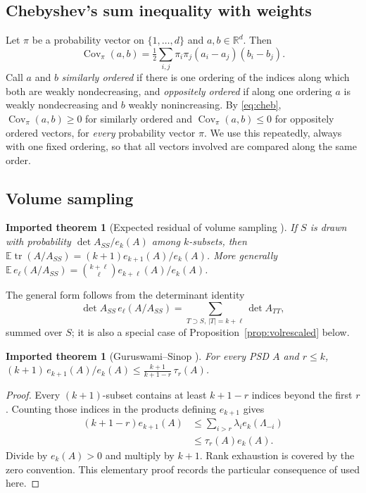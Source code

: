 \documentclass[11pt,a4paper]{article}
\newtheorem{imported}[theorem]{Imported theorem}
\theoremstyle{definition}
\newcommand{\E}{\mathbb{E}}
\newcommand{\R}{\mathbb{R}}
\newcommand{\tr}{\operatorname{tr}}
\newcommand{\Cov}{\operatorname{Cov}}
\begin{document}
\subsection{Chebyshev's sum inequality with weights}
Let $\pi$ be a probability vector on $\{1,\dots,d\}$ and $a,b\in\R^d$. Then
\begin{equation}\label{eq:cheb}
\Cov_\pi(a,b)=\tfrac12\sum_{i,j}\pi_i\pi_j(a_i-a_j)(b_i-b_j).
\end{equation}
Call $a$ and $b$ \emph{similarly ordered} if there is one ordering of the indices along which both are weakly nondecreasing, and \emph{oppositely ordered} if along one ordering $a$ is weakly nondecreasing and $b$ weakly nonincreasing. By \eqref{eq:cheb}, $\Cov_\pi(a,b)\ge0$ for similarly ordered and $\Cov_\pi(a,b)\le0$ for oppositely ordered vectors, for \emph{every} probability vector $\pi$. We use this repeatedly, always with one fixed ordering, so that all vectors involved are compared along the same order.

\subsection{Volume sampling}
\begin{imported}[Expected residual of volume sampling {\cite{DRVW}}]\label{imp:DRVW}
If $S$ is drawn with probability $\det A_{SS}/e_k(A)$ among $k$-subsets, then $\E\tr(A/A_{SS})=(k+1)e_{k+1}(A)/e_k(A)$. More generally $\E\,e_\ell(A/A_{SS})=\binom{k+\ell}{\ell}e_{k+\ell}(A)/e_k(A)$.
\end{imported}
The general form follows from the determinant identity
\[
\det A_{SS}\,e_\ell(A/A_{SS})=\sum_{T\supset S,\,|T|=k+\ell}\det A_{TT},
\]
summed over $S$; it is also a special case of Proposition~\ref{prop:volrescaled} below.

\begin{imported}[Guruswami--Sinop {\cite{GS}}]\label{imp:GS}
For every PSD $A$ and $r\le k$, $(k+1)\,e_{k+1}(A)/e_k(A)\le\frac{k+1}{k+1-r}\,\tau_r(A)$.
\end{imported}

\begin{proof}
Every $(k+1)$-subset contains at least $k+1-r$ indices beyond the first $r$. Counting those indices in the products defining $e_{k+1}$ gives
\begin{align*}
(k+1-r)e_{k+1}(A)
&\le \sum_{i>r}\lambda_i e_k(\Lambda_{-i})\\
&\le \tau_r(A)e_k(A).
\end{align*}
Divide by $e_k(A)>0$ and multiply by $k+1$. Rank exhaustion is covered by the zero convention. This elementary proof records the particular consequence of \cite{GS} used here.
\end{proof}
\end{document}
